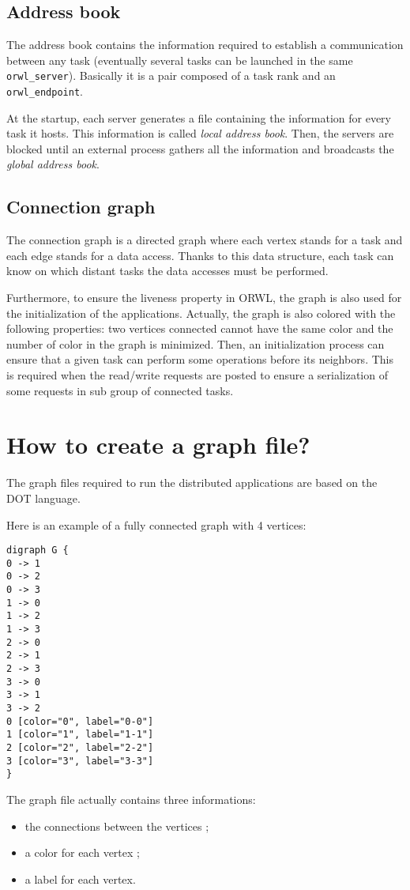 \documentclass[10pt]{article}
\begin{document}
\subsection{Address book}
The address book contains the information required to establish a
communication between any task (eventually several tasks can be
launched in the same \texttt{orwl\_server}). Basically it is a pair
composed of a task rank and an \texttt{orwl\_endpoint}.

At the startup, each server generates a file containing the
information for every task it hosts. This information is called
\textit{local address book}. Then, the servers are blocked until an
external process gathers all the information and broadcasts the
\textit{global address book}.

\subsection{Connection graph}\label{subsec:connection-graph}
The connection graph is a directed graph where each vertex stands for
a task and each edge stands for a data access. Thanks to this data
structure, each task can know on which distant tasks the data accesses
must be performed.

Furthermore, to ensure the liveness property in ORWL, the graph is
also used for the initialization of the applications. Actually, the
graph is also colored with the following properties: two vertices
connected cannot have the same color and the number of color in the
graph is minimized. Then, an initialization process can ensure that
a given task can perform some operations before its neighbors. This is
required when the read/write requests are posted to ensure a
serialization of some requests in sub group of connected tasks.

\section{How to create a graph file?}
The graph files required to run the distributed applications are based
on the DOT language.

Here is an example of a fully connected graph with 4 vertices:
\begin{verbatim}
digraph G {
0 -> 1
0 -> 2
0 -> 3
1 -> 0
1 -> 2
1 -> 3
2 -> 0
2 -> 1
2 -> 3
3 -> 0
3 -> 1
3 -> 2
0 [color="0", label="0-0"]
1 [color="1", label="1-1"]
2 [color="2", label="2-2"]
3 [color="3", label="3-3"]
}
\end{verbatim}
The graph file actually contains three informations:
\begin{itemize}
\item the connections between the vertices ;
\item a color for each vertex ;
\item a label for each vertex.
\end{itemize}
\end{document}
